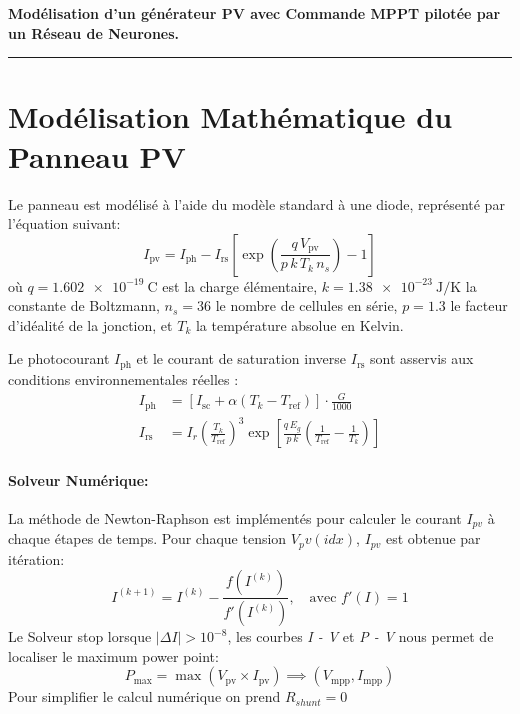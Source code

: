 \documentclass[11pt,a4paper]{article}
\begin{document}
 
\begin{center}
    {\LARGE \textbf{\textcolor{primary}{Modélisation d'un générateur PV avec Commande MPPT pilotée par un Réseau de Neurones.}}}
 
 
    \rule{\linewidth}{1.2pt}
\end{center}

\vspace{0.3cm}

 

\vspace{0.5cm}

 
 
\section{Modélisation Mathématique du Panneau PV}
Le panneau est modélisé à l'aide du modèle standard à une diode, représenté par l'équation suivant:
\begin{equation}
    I_{\mathrm{pv}} = I_{\mathrm{ph}} - I_{\mathrm{rs}} \left[ \exp\left( \frac{q \, V_{\mathrm{pv}}}{p \, k \, T_k \, n_s} \right) - 1 \right]
    \label{eq:pv_diode}
\end{equation}
où $q = \SI{1.602e-19}{\coulomb}$ est la charge élémentaire, $k = \SI{1.38e-23}{\joule\per\kelvin}$ la constante de Boltzmann, $n_s = 36$ le nombre de cellules en série, $p = 1.3$ le facteur d'idéalité de la jonction, et $T_k$ la température absolue en Kelvin.

Le photocourant $I_{\mathrm{ph}}$ et le courant de saturation inverse $I_{\mathrm{rs}}$ sont asservis aux conditions environnementales réelles :
\begin{align}
    I_{\mathrm{ph}} &= \left[ I_{\mathrm{sc}} + \alpha (T_k - T_{\mathrm{ref}}) \right] \cdot \frac{G}{1000} \\
    I_{\mathrm{rs}} &= I_r \left( \frac{T_k}{T_{\mathrm{ref}}} \right)^3 \exp\left[ \frac{q \, E_g}{p \, k} \left( \frac{1}{T_{\mathrm{ref}}} - \frac{1}{T_k} \right) \right]
\end{align}

\paragraph{Solveur Numérique:} 
La méthode de Newton-Raphson est implémentés pour calculer le courant $I_{pv}$ à chaque étapes de temps. Pour chaque tension $V_pv(idx)$, $I_{pv}$ est obtenue par itération:
\begin{equation}
    I^{(k+1)} = I^{(k)} - \frac{f(I^{(k)})}{f'(I^{(k)})}, \quad \text{avec } f'(I) = 1
\end{equation} 
Le Solveur stop lorsque $|\Delta I| > 10^{-8}$, les courbes \textit{I - V} et \textit{P - V} nous permet de localiser le maximum power point:
\begin{equation}
    P_{\mathrm{max}} = \max(V_{\mathrm{pv}} \times I_{\mathrm{pv}}) \implies (V_{\mathrm{mpp}}, I_{\mathrm{mpp}})
\end{equation}
Pour simplifier le calcul numérique on prend $R_{shunt} = 0$
\end{document}
